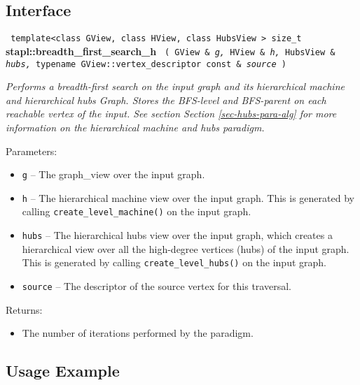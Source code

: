 \subsection{Interface} \label{sec-br-first-hmach-hubs-alg-inter}

\noindent
\texttt{%
template<class GView, class HView, class HubsView >
\newline
size\_t 
}
\newline
\textbf{stapl::breadth\_first\_search\_h}%
\newline
\texttt{%
(
GView \&
\textit{g,}%
HView \&
\textit{h,}%
HubsView \&
\textit{hubs,}%
typename GView::vertex\_descriptor const \&
\textit{source}%
)     
}
\vspace{0.4cm}

\textit{
Performs a breadth-first search on the input graph and its hierarchical machine and hierarchical hubs Graph. 
Stores the BFS-level and BFS-parent on each reachable vertex of the input.
See section
Section \ref{sec-hubs-para-alg}
for more information on the hierarchical machine and hubs paradigm.
}
\vspace{0.4cm}

Parameters:
\begin{itemize}
\item
\texttt{g} --
The graph\_view over the input graph.
\item
\texttt{h} --
The hierarchical machine view over the input graph. This is generated by calling
\texttt{create\_level\_machine()}%
 on the input graph.
\item
\texttt{hubs} --
The hierarchical hubs view over the input graph, which creates a hierarchical view over all the high-degree vertices (hubs) of the input graph. This is generated by calling 
\texttt{create\_level\_hubs()}%
on the input graph.
\item
\texttt{source} --
The descriptor of the source vertex for this traversal.
\end{itemize}

Returns:
\begin{itemize}
\item
The number of iterations performed by the paradigm. 
\end{itemize}

\subsection{Usage Example} \label{sec-br-first-hmach-hubs-alg-use}

